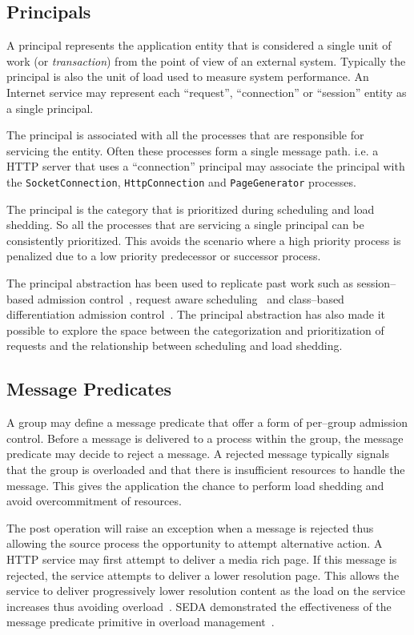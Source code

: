 \documentclass[conference]{IEEEtran}
\begin{document}
\subsection{Principals}

A principal represents the application entity that is considered a single unit of work (or \emph{transaction}) from the point of view of an external system. Typically the principal is also the unit of load used to measure system performance. An Internet service may represent each ``request'', ``connection'' or ``session'' entity as a single principal.

The principal is associated with all the processes that are responsible for servicing the entity. Often these processes form a single message path. i.e. a HTTP server that uses a ``connection'' principal may associate the principal with the \verb+SocketConnection+, \verb+HttpConnection+ and \verb+PageGenerator+ processes.

The principal is the category that is prioritized during scheduling and load shedding. So all the processes that are servicing a single principal can be consistently prioritized. This avoids the scenario where a high priority process is penalized due to a low priority predecessor or successor process.

The principal abstraction has been used to replicate past work such as session--based admission control~\cite{Cherkasova:2002yb}, request aware scheduling~\cite{Zhou06RequestAware} and class--based differentiation admission control~\cite{welsh03Adaptive}. The principal abstraction has also made it possible to explore the space between the categorization and prioritization of requests and the relationship between scheduling and load shedding.

\subsection{Message Predicates}

A group may define a message predicate that offer a form of per--group admission control. Before a message is delivered to a process within the group, the message predicate may decide to reject a message. A rejected message typically signals that the group is overloaded and that there is insufficient resources to handle the message. This gives the application the chance to perform load shedding and avoid overcommitment of resources.

The post operation will raise an exception when a message is rejected thus allowing the source process the opportunity to attempt alternative action. A HTTP service may first attempt to deliver a media rich page. If this message is rejected, the service attempts to deliver a lower resolution page. This allows the service to deliver progressively lower resolution content as the load on the service increases thus avoiding overload~\cite{abdelzaher99web}. SEDA demonstrated the effectiveness of the message predicate primitive in overload management~\cite{welsh03Adaptive}. 
\end{document}
